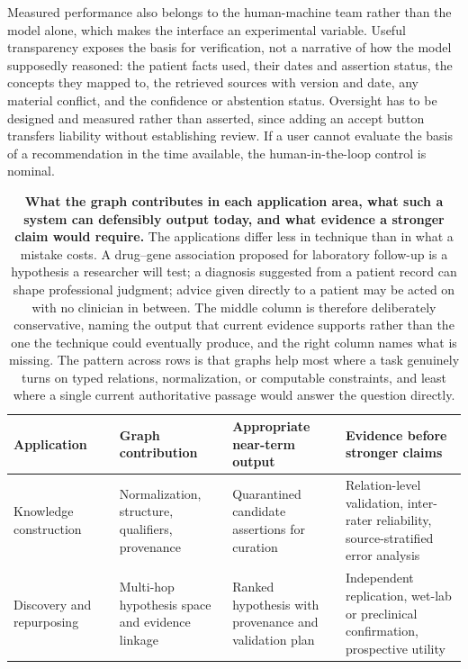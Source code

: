Measured performance also belongs to the human-machine team rather than the model alone, which makes the interface an experimental variable. Useful transparency exposes the basis for verification, not a narrative of how the model supposedly reasoned: the patient facts used, their dates and assertion status, the concepts they mapped to, the retrieved sources with version and date, any material conflict, and the confidence or abstention status. Oversight has to be designed and measured rather than asserted, since adding an accept button transfers liability without establishing review. If a user cannot evaluate the basis of a recommendation in the time available, the human-in-the-loop control is nominal.

\begin{table}[!t]
\centering
\caption{\textbf{What the graph contributes in each application area, what such a system can defensibly output today, and what evidence a stronger claim would require.} The applications differ less in technique than in what a mistake costs. A drug--gene association proposed for laboratory follow-up is a hypothesis a researcher will test; a diagnosis suggested from a patient record can shape professional judgment; advice given directly to a patient may be acted on with no clinician in between. The middle column is therefore deliberately conservative, naming the output that current evidence supports rather than the one the technique could eventually produce, and the right column names what is missing. The pattern across rows is that graphs help most where a task genuinely turns on typed relations, normalization, or computable constraints, and least where a single current authoritative passage would answer the question directly.}
\label{tab:apps}
\footnotesize
\begin{tabularx}{\textwidth}{@{}L{2.4cm} >{\raggedright\arraybackslash}p{1.5cm} Y Y Y@{}}
\toprule
\textbf{Application} &  & \textbf{Graph contribution} & \textbf{Appropriate near-term output} & \textbf{Evidence before stronger claims} \\
\midrule
Knowledge construction &  & Normalization, structure, qualifiers, provenance & Quarantined candidate assertions for curation & Relation-level validation, inter-rater reliability, source-stratified error analysis \\
Discovery and repurposing &  & Multi-hop hypothesis space and evidence linkage & Ranked hypothesis with provenance and validation plan & Independent replication, wet-lab or preclinical confirmation, prospective utility \\

\end{tabularx}
\end{table}
